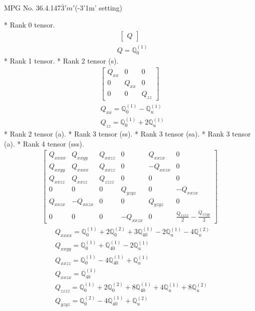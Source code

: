 \documentclass[fleqn,8pt,landscape]{jsarticle}
\begin{document}
\setcounter{MaxMatrixCols}{32}

\renewcommand{\tablename}{Table~}
\renewcommand{\figurename}{Figure~}
\begin{center}
\LARGE
MPG No. 36.4.147\quad$\bar{3}'m'$\quad(-3'1m' setting)
\end{center}
* Rank 0 tensor.
\begin{align*}
\begin{bmatrix} Q \end{bmatrix}
\end{align*}
\begin{align*}
& Q = \mathbb{Q}_{0}^{(1)}
\end{align*}
* Rank 1 tensor.
* Rank 2 tensor (s).
\begin{align*}
\begin{bmatrix} Q_{xx} & 0 & 0 \\ 0 & Q_{xx} & 0 \\ 0 & 0 & Q_{zz} \end{bmatrix}
\end{align*}
\begin{align*}
& Q_{xx} = \mathbb{Q}_{0}^{(1)} - \mathbb{Q}_{u}^{(1)} \\
& Q_{zz} = \mathbb{Q}_{0}^{(1)} + 2 \mathbb{Q}_{u}^{(1)}
\end{align*}
* Rank 2 tensor (a).
* Rank 3 tensor (ss).
* Rank 3 tensor (sa).
* Rank 3 tensor (a).
* Rank 4 tensor (sss).
\begin{align*}
\begin{bmatrix} Q_{xxxx} & Q_{xxyy} & Q_{xxzz} & 0 & Q_{xxzx} & 0 \\ Q_{xxyy} & Q_{xxxx} & Q_{xxzz} & 0 & - Q_{xxzx} & 0 \\ Q_{xxzz} & Q_{xxzz} & Q_{zzzz} & 0 & 0 & 0 \\ 0 & 0 & 0 & Q_{yzyz} & 0 & - Q_{xxzx} \\ Q_{xxzx} & - Q_{xxzx} & 0 & 0 & Q_{yzyz} & 0 \\ 0 & 0 & 0 & - Q_{xxzx} & 0 & \frac{Q_{xxxx}}{2} - \frac{Q_{xxyy}}{2} \end{bmatrix}
\end{align*}
\begin{align*}
& Q_{xxxx} = \mathbb{Q}_{0}^{(1)} + 2 \mathbb{Q}_{0}^{(2)} + 3 \mathbb{Q}_{40}^{(1)} - 2 \mathbb{Q}_{u}^{(1)} - 4 \mathbb{Q}_{u}^{(2)} \\
& Q_{xxyy} = \mathbb{Q}_{0}^{(1)} + \mathbb{Q}_{40}^{(1)} - 2 \mathbb{Q}_{u}^{(1)} \\
& Q_{xxzz} = \mathbb{Q}_{0}^{(1)} - 4 \mathbb{Q}_{40}^{(1)} + \mathbb{Q}_{u}^{(1)} \\
& Q_{xxzx} = \mathbb{Q}_{4b}^{(1)} \\
& Q_{zzzz} = \mathbb{Q}_{0}^{(1)} + 2 \mathbb{Q}_{0}^{(2)} + 8 \mathbb{Q}_{40}^{(1)} + 4 \mathbb{Q}_{u}^{(1)} + 8 \mathbb{Q}_{u}^{(2)} \\
& Q_{yzyz} = \mathbb{Q}_{0}^{(2)} - 4 \mathbb{Q}_{40}^{(1)} + \mathbb{Q}_{u}^{(2)}
\end{align*}
\end{document}
